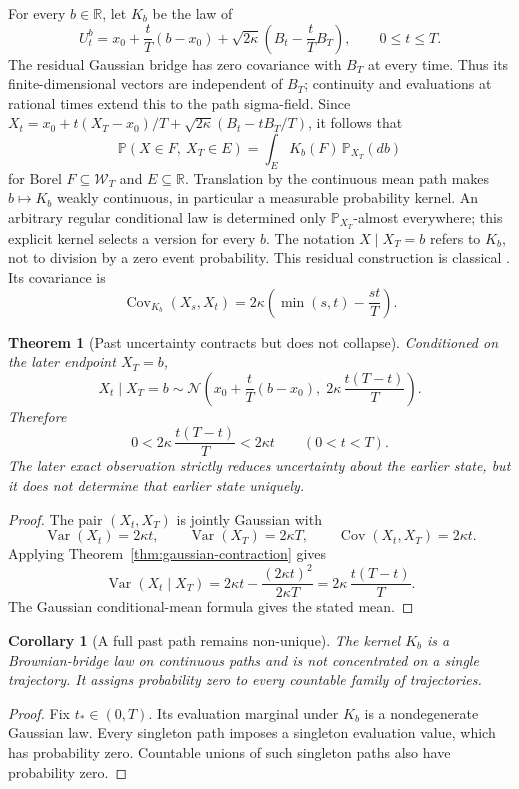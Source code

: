 \documentclass[11pt]{article}
\newtheorem{theorem}[definition]{Theorem}
\newtheorem{corollary}[definition]{Corollary}
\newcommand{\Wcal}{\mathcal W}
\begin{document}
For every $b\in\mathbb R$, let $K_b$ be the law of
\begin{equation}
\label{eq:bridge-kernel}
U_t^b=x_0+\frac{t}{T}(b-x_0)
+\sqrt{2\kappa}\left(B_t-\frac{t}{T}B_T\right),
\qquad 0\le t\le T.
\end{equation}
The residual Gaussian bridge has zero covariance with $B_T$ at every
time. Thus its finite-dimensional vectors are independent of $B_T$;
continuity and evaluations at rational times extend this to the path
sigma-field. Since $X_t= x_0+t(X_T-x_0)/T+
\sqrt{2\kappa}(B_t-tB_T/T)$, it follows that
\[
\mathbb P(X\in F,\ X_T\in E)
=\int_E K_b(F)\,\mathbb P_{X_T}(db)
\]
for Borel $F\subseteq\Wcal_T$ and $E\subseteq\mathbb R$.
Translation by the continuous mean path makes $b\mapsto K_b$ weakly
continuous, in particular a measurable probability kernel.
An arbitrary regular conditional law is determined only
$\mathbb P_{X_T}$-almost everywhere; this explicit kernel selects a
version for every $b$. The notation $X\mid X_T=b$ refers to $K_b$,
not to division by a zero event probability. This residual construction
is classical \cite[Theorem 22.1 and the following remark]{Pitman2003}.
Its covariance is
\[
\operatorname{Cov}_{K_b}(X_s,X_t)
=2\kappa\left(\min(s,t)-\frac{st}{T}\right).
\]

\begin{theorem}[Past uncertainty contracts but does not collapse]
\label{thm:brownian-bridge}
Conditioned on the later endpoint \(X_T=b\),
\[
X_t\mid X_T=b
\sim
\mathcal N\!\left(
x_0+\frac{t}{T}(b-x_0),
\;
2\kappa\,\frac{t(T-t)}{T}
\right).
\]
Therefore
\[
0<
2\kappa\,\frac{t(T-t)}{T}
<
2\kappa t
\qquad
(0<t<T).
\]
The later exact observation strictly reduces uncertainty about the earlier state, but it does
not determine that earlier state uniquely.
\end{theorem}

\begin{proof}
The pair \((X_t,X_T)\) is jointly Gaussian with
\[
\operatorname{Var}(X_t)=2\kappa t,
\qquad
\operatorname{Var}(X_T)=2\kappa T,
\qquad
\operatorname{Cov}(X_t,X_T)=2\kappa t.
\]
Applying Theorem~\ref{thm:gaussian-contraction} gives
\[
\operatorname{Var}(X_t\mid X_T)
=
2\kappa t-\frac{(2\kappa t)^2}{2\kappa T}
=
2\kappa\,\frac{t(T-t)}{T}.
\]
The Gaussian conditional-mean formula gives the stated mean.
\end{proof}

\begin{corollary}[A full past path remains non-unique]
\label{cor:path-nonuniqueness}
The kernel $K_b$ is a Brownian-bridge law on continuous paths
and is not concentrated on a single trajectory. It assigns probability
zero to every countable family of trajectories.
\end{corollary}
\begin{proof}
Fix $t_*\in(0,T)$. Its evaluation marginal under $K_b$ is a
nondegenerate Gaussian law. Every singleton path imposes a singleton
evaluation value, which has probability zero. Countable unions of such
singleton paths also have probability zero.
\end{proof}
\end{document}
